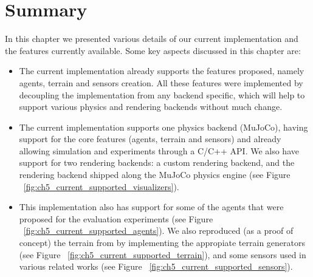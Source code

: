 \section{Summary}

In this chapter we presented various details of our current implementation and
the features currently available. Some key aspects discussed in this chapter are:

\begin{itemize}
    \item The current implementation already supports the features proposed, namely
          agents, terrain and sensors creation. All these features were implemented
          by decoupling the implementation from any backend specific, which will help 
          to support various physics and rendering backends without much change.

    \item The current implementation supports one physics backend (MuJoCo),
          having support for the core features (agents, terrain and sensors) and
          already allowing simulation and experiments through a C/C++ API.
          We also have support for two rendering backends: a custom rendering backend,
          and the rendering backend shipped along the MuJoCo physics engine 
          (see Figure ~\ref{fig:ch5_current_supported_visualizers}).

    \item This implementation also has support for some of the agents that were
          proposed for the evaluation experiments (see Figure ~\ref{fig:ch5_current_supported_agents}).
          We also reproduced (as a proof of concept) the terrain from \cite{DeepmindEmergenceLocomotion} 
          by implementing the appropiate terrain generators (see Figure ~\ref{fig:ch5_current_supported_terrain}),
          and some sensors used in various related works (see Figure ~\ref{fig:ch5_current_supported_sensors}).
\end{itemize}